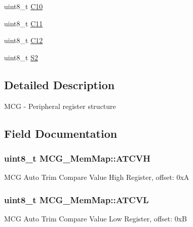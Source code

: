 \begin{DoxyCompactItemize}
\item 
uint8\+\_\+t \hyperlink{struct_m_c_g___mem_map_a184325f5e5750f8e816b01aeed13d695}{C10}
\item 
uint8\+\_\+t \hyperlink{struct_m_c_g___mem_map_a75c88fec125448ba651f4853f99ecc11}{C11}
\item 
uint8\+\_\+t \hyperlink{struct_m_c_g___mem_map_a51b6f129c0114441288747fbe336d1cb}{C12}
\item 
uint8\+\_\+t \hyperlink{struct_m_c_g___mem_map_a97d548f46a8b3fa3cd094dbbd5e579af}{S2}
\end{DoxyCompactItemize}


\subsection{Detailed Description}
M\+C\+G -\/ Peripheral register structure 

\subsection{Field Documentation}
\hypertarget{struct_m_c_g___mem_map_a74fee35955b4ec57aa8058bd57a926a8}{}
\subsubsection[{A\+T\+C\+V\+H}]{\setlength{\rightskip}{0pt plus 5cm}uint8\+\_\+t M\+C\+G\+\_\+\+Mem\+Map\+::\+A\+T\+C\+V\+H}\label{struct_m_c_g___mem_map_a74fee35955b4ec57aa8058bd57a926a8}
M\+C\+G Auto Trim Compare Value High Register, offset\+: 0x\+A \hypertarget{struct_m_c_g___mem_map_a913b6fd7776c0377e299fdf0eeb166af}{}
\subsubsection[{A\+T\+C\+V\+L}]{\setlength{\rightskip}{0pt plus 5cm}uint8\+\_\+t M\+C\+G\+\_\+\+Mem\+Map\+::\+A\+T\+C\+V\+L}\label{struct_m_c_g___mem_map_a913b6fd7776c0377e299fdf0eeb166af}
M\+C\+G Auto Trim Compare Value Low Register, offset\+: 0x\+B \hypertarget{struct_m_c_g___mem_map_a433a36d1aeb9d033b502ee263c1495a1}{}

